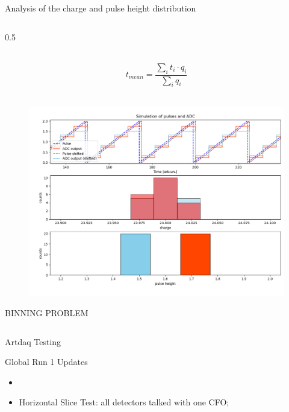 \documentclass{beamer}[10pt]
\begin{document}
\begin{frame}{Analysis of the charge and pulse height distribution}
\begin{columns}
\begin{column}{0.5\framewidth}
\begin{figure}[H]
     \label{fig:wffytl}
   \end{figure}
  \vspace{-7mm}
  \\
  {\tiny $$t_{mean}=\frac{\sum_i t_i \cdot q_i}{\sum_i q_i}$$}
  \\
  \vspace{-7mm}
  \begin{figure}[H]
     \centering
     \includegraphics[width= 0.95\columnwidth]{figures/png/pres.png}
     \label{fig:wffytl}
   \end{figure}
  BINNING PROBLEM
  \end{column}
  \end{columns}
  \end{frame}
  





















\begin{frame}{Artdaq Testing}
\end{frame}
\begin{frame}{Global Run 1 Updates}
\begin{itemize}
\item 
\item Horizontal Slice Test: all detectors talked with one CFO;
\end{itemize}
\end{frame} 
\iffalse
\end{document}
